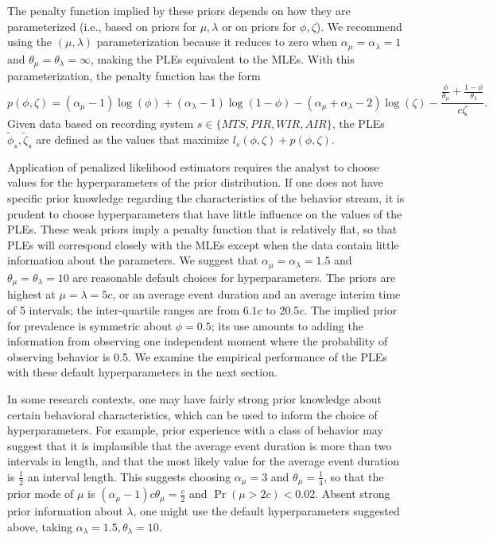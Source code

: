 \documentclass[man, noextraspace, floatsintext]{apa6}\usepackage[]{graphicx}\usepackage[]{color}
\begin{document}
The penalty function implied by these priors depends on how they are parameterized (i.e., based on priors for $\mu, \lambda$ or on priors for $\phi, \zeta$). We recommend using the $\left(\mu,\lambda\right)$ parameterization because it reduces to zero when $\alpha_\mu = \alpha_\lambda = 1$ and $\theta_\mu = \theta_\lambda = \infty$, making the PLEs equivalent to the MLEs.
With this parameterization, the penalty function has the form 
\begin{equation}
p\left(\phi, \zeta\right) = \left(\alpha_\mu - 1\right) \log \left(\phi\right) + \left(\alpha_\lambda - 1\right) \log \left(1 - \phi\right) - \left(\alpha_\mu + \alpha_\lambda - 2\right) \log\left(\zeta\right) - \frac{\frac{\phi}{\theta_\mu} + \frac{1-\phi}{\theta_\lambda}}{c \zeta}.
\end{equation}
Given data based on recording system $s \in \{MTS, PIR, WIR, AIR\}$, the PLEs $\tilde\phi_s, \tilde\zeta_s$ are defined as the values that maximize $l_s\left(\phi, \zeta\right) + p\left(\phi, \zeta\right)$. 



Application of penalized likelihood estimators requires the analyst to choose values for the hyperparameters of the prior distribution. If one does not have specific prior knowledge regarding the characteristics of the behavior stream, it is prudent to choose hyperparameters that have little influence on the values of the PLEs. These weak priors imply a penalty function that is relatively flat, so that PLEs will correspond closely with the MLEs except when the data contain little information about the parameters. We suggest that $\alpha_\mu = \alpha_\lambda = 1.5$ and $\theta_\mu = \theta_\lambda = 10$ are reasonable default choices for hyperparameters. The priors are highest at $\mu = \lambda = 5 c$, or an average event duration and an average interim time of 5 intervals; the inter-quartile ranges are from $6.1 c$ to $20.5 c$. The implied prior for prevalence is symmetric about $\phi = 0.5$; its use amounts to adding the information from observing one independent moment where the probability of observing behavior is 0.5. We examine the empirical performance of the PLEs with these default hyperparameters in the next section.



In some research contexts, one may have fairly strong prior knowledge about certain behavioral characteristics, which can be used to inform the choice of hyperparameters. 
For example, prior experience with a class of behavior may suggest that it is implausible that the average event duration is more than two intervals in length, and that the most likely value for the average event duration is $\frac{1}{2}$ an interval length. 
This suggests choosing $\alpha_\mu = 3$ and $\theta_\mu = \frac{1}{4}$, so that the prior mode of $\mu$ is $\left(\alpha_\mu - 1\right) c \theta_\mu = \frac{c}{2}$ and $\Pr(\mu > 2c) < 0.02$.
Absent strong prior information about $\lambda$, one might use the default hyperparameters suggested above, taking $\alpha_\lambda = 1.5, \theta_\lambda = 10$. 
\end{document}
